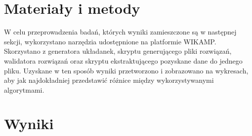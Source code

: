 \documentclass{classrep}
\begin{document}
\section{Materiały i metody}
{\color{black}
W celu przeprowadzenia badań, których wyniki zamieszczone są w następnej sekcji, wykorzystano narzędzia udostępnione na platformie WIKAMP. Skorzystano z generatora układanek, skryptu generującego pliki rozwiązań, walidatora rozwiązań oraz skryptu ekstraktującego pozyskane dane do jednego pliku. Uzyskane w ten sposób wyniki przetworzono i zobrazowano na wykresach, aby jak najdokładniej przedstawić różnice między wykorzystywanymi algorytmami.}

\section{Wyniki}
\end{document}
